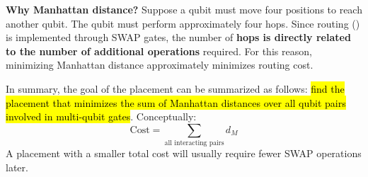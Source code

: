 \highspace
\textcolor{Green3}{ \textbf{Why Manhattan distance?}} Suppose a qubit must move four positions to reach another qubit. The qubit must perform approximately four hops. Since routing () is implemented through SWAP gates, the number of \textbf{hops is directly related to the number of additional operations} required. For this reason, minimizing Manhattan distance approximately minimizes routing cost.

\highspace
In summary, the goal of the placement can be summarized as follows: \hl{find the placement that minimizes the sum of Manhattan distances over all qubit pairs involved in multi-qubit gates}. Conceptually:
\begin{equation*}
    \text{Cost} = \sum_{\text{all interacting pairs}} d_{M}
\end{equation*}
A placement with a smaller total cost will usually require fewer SWAP operations later.